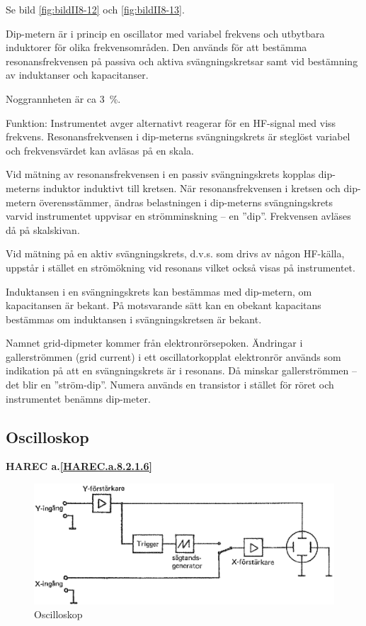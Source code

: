 Se bild \ref{fig:bildII8-12} och \ref{fig:bildII8-13}.

Dip-metern är i princip en oscillator med variabel frekvens och
utbytbara induktorer för olika frekvensområden.
Den används för att bestämma resonansfrekvensen på passiva och aktiva
svängningskretsar samt vid bestämning av induktanser och kapacitanser.

Noggrannheten är ca 3~\%.

Funktion: Instrumentet avger alternativt reagerar för en HF-signal med
viss frekvens. Resonansfrekvensen i dip-meterns svängningskrets är
steglöst variabel och frekvensvärdet kan avläsas på en skala.

Vid mätning av resonansfrekvensen i en passiv svängningskrets kopplas
dip-meterns induktor induktivt till kretsen. När resonansfrekvensen i
kretsen och dip-metern överensstämmer, ändras belastningen i
dip-meterns svängningskrets varvid instrumentet uppvisar en
strömminskning -- en ''dip''. Frekvensen avläses då på skalskivan.

Vid mätning på en aktiv svängningskrets, d.v.s. som drivs av någon
HF-källa, uppstår i stället en strömökning vid resonans vilket också
visas på instrumentet.

Induktansen i en svängningskrets kan bestämmas med dip-metern, om
kapacitansen är bekant. På motsvarande sätt kan en obekant kapacitans
bestämmas om induktansen i svängningskretsen är bekant.

Namnet grid-dipmeter kommer från elektronrörsepoken. Ändringar i
gallerströmmen (grid current) i ett oscillatorkopplat elektronrör
används som indikation på att en svängningskrets är i resonans. Då
minskar gallerströmmen -- det blir en ''ström-dip''. Numera används en
transistor i stället för röret och instrumentet benämns dip-meter.

\subsection{Oscilloskop}
\textbf{
HAREC a.\ref{HAREC.a.8.2.1.6}\label{myHAREC.a.8.2.1.6}
}

\begin{figure}
  \includegraphics[width=\textwidth]{images/cropped_pdfs/bild_2_8-14.pdf}
  \caption{Oscilloskop}
  \label{fig:bildII8-14}
\end{figure}

